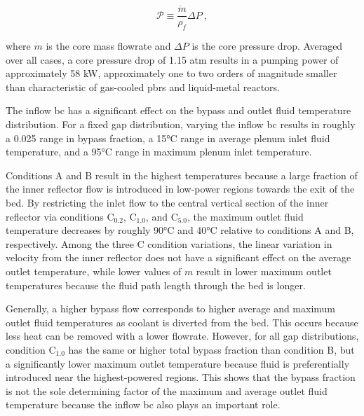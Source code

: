 \begin{equation}
\label{eq:PumpingPower}
\mathcal{P}\equiv\frac{\dot{m}}{\rho_f}\Delta P\ ,
\end{equation}

\noindent where \(\dot{m}\) is the core mass flowrate and \(\Delta P\) is the core pressure drop. Averaged over all cases, a core pressure drop of 1.15 atm results in a pumping power of approximately 58 kW, approximately one to two orders of magnitude smaller than characteristic of gas-cooled \glspl{pbr} and liquid-metal reactors.

The inflow \gls{bc} has a significant effect on the bypass and outlet fluid temperature distribution. For a fixed gap distribution, varying the inflow \gls{bc} results in roughly a 0.025 range in bypass fraction, a 15\si{\celsius} range in average plenum inlet fluid temperature, and a 95\si{\celsius} range in maximum plenum inlet temperature. 

Conditions A and B result in the highest temperatures because a large fraction of the inner reflector flow is introduced in low-power regions towards the exit of the bed. By restricting the inlet flow to the central vertical section of the inner reflector via conditions C$_\text{0.2}$, C$_\text{1.0}$, and C$_\text{5.0}$, the maximum outlet fluid temperature decreases by roughly 90\si{\celsius} and 40\si{\celsius} relative to conditions A and B, respectively.  Among the three C condition variations, the linear variation in velocity from the inner reflector does not have a significant effect on the average outlet temperature, while lower values of \(m\) result in lower maximum outlet temperatures because the fluid path length through the bed is longer. 
 
Generally, a higher bypass flow corresponds to higher average and maximum outlet fluid temperatures as coolant is diverted from the bed. This occurs because less heat can be removed with a lower flowrate. However, for all gap distributions, condition C$_\text{1.0}$ has the same or higher total bypass fraction than condition B, but a significantly lower maximum outlet temperature because fluid is preferentially introduced near the highest-powered regions. This shows that the bypass fraction is not the sole determining factor of the maximum and average outlet fluid temperature because the inflow \gls{bc} also plays an important role.

